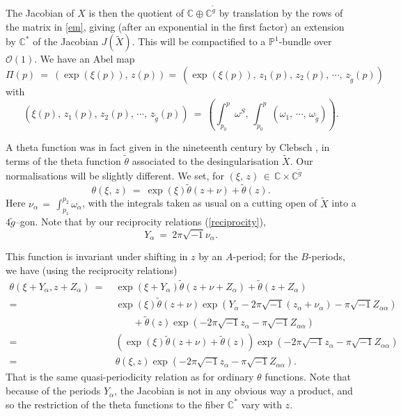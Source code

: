 \documentclass[12pt,reqno]{amsart}
\numberwithin{equation}{section}
\theoremstyle{definition}
\theoremstyle{remark}
\def\bC{{\mathbb {C}}}
\def\bP{{\mathbb {P}}}
\def\pO{{\mathcal O}}
\begin{document}
The Jacobian of $X$ is then the quotient of $\bC\oplus \bC^{\widetilde g}$ by translation by the rows of
the matrix in \eqref{em}, giving (after an exponential in the first factor)
an extension by $\bC^*$ of the Jacobian $J(\widetilde X)$. This will be compactified to a $\bP^1$-bundle
over $\pO(1)$. We   have an Abel map 
\begin{equation} \label{Abel1}\Pi(p)\ =\ ( \exp(\xi(p)),\, z(p)) =\ ( \exp(\xi(p)),\, z_1(p), \, z_2(p),\,\cdots ,\, z_{\widetilde g}(p) )\end{equation}
with
$$(\xi(p),\, z_1(p), \, z_2(p),\,\cdots ,\, z_{\widetilde g}(p) )\ =\  (\int_{p_0}^{p}  \omega^S,\, \int_{p_0}^{p}( \omega_1,\,\cdots ,\, \omega_{\widetilde g})).$$

A theta function was in fact given in the nineteenth century by Clebsch \cite{Cl}, in terms of the 
theta function $\widetilde\theta$ associated to the desingularisation $\widetilde X$. Our normalisations will 
be slightly different. We set, for $(\xi ,\, z)\,\in\, \bC\times \bC^{\widetilde g}$
\begin{equation}
\theta (\xi,\, z)\ =\   \exp({\xi}) \widetilde{\theta}(z+\nu) + \widetilde{\theta} (z ).  
\end{equation}
Here $\nu_\alpha \,=\, \int_{p_1}^{p_2} \omega_\alpha$, with the integrals taken as usual on a
cutting open of $\widetilde X$ into a $4\widetilde g$--gon. Note that by our reciprocity
relations (\ref{reciprocity}), $$Y_\alpha\ =\ 2\pi\sqrt{-1}\nu_\alpha .$$

This function is invariant under shifting in $z$ by an $A$-period; for the $B$-periods, we have
(using the reciprocity relations)
\begin{align*}\label{B-period}
\theta (\xi + Y_\alpha, z + Z_\alpha)\ =&\ \exp ({\xi+Y_\alpha}) \widetilde{\theta} (z + \nu +Z_\alpha ) +
\widetilde{\theta}(z + Z_\alpha)\\
=&\ \exp ({\xi}) \widetilde{\theta} (z + \nu )\exp (Y_\alpha -2\pi\sqrt{-1} (z_\alpha +\nu_\alpha) -
\pi\sqrt{-1}Z_{\alpha\alpha})\\
&\qquad + \widetilde{\theta} (z )\exp(-2\pi\sqrt{-1}z_\alpha  -\pi
\sqrt{-1} Z_{\alpha\alpha})\\
=&\ (\exp({\xi}) \widetilde{\theta} (z + \nu ) +\widetilde{\theta} (z ))
\exp(-2\pi \sqrt{-1} z_\alpha -\pi\sqrt{-1} Z_{\alpha\alpha})\ \\
=&\ \theta (\xi , z) 
\exp(-2\pi\sqrt{-1} z_\alpha -\pi\sqrt{-1} Z_{\alpha\alpha}).
\end{align*}
That is the same quasi-periodicity relation as for ordinary $\theta$ functions.
Note that because of the periods $Y_\alpha$, the Jacobian is not in any obvious way a product, and so the restriction of the theta functions to the fiber $\bC^*$ vary with $z$. 
\end{document}
